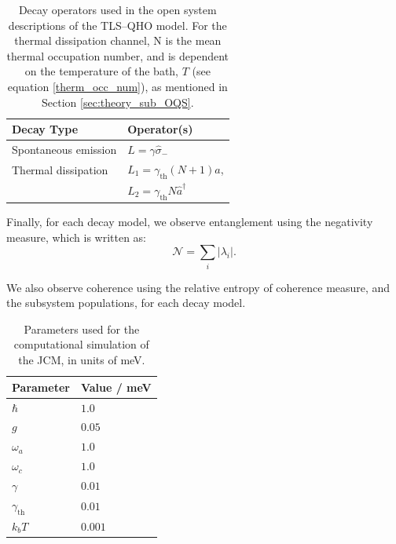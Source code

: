 \documentclass[11pt]{article}
\begin{document}
\begin{table}[H]
    \centering
    \caption{Decay operators used in the open system descriptions of the TLS--QHO model. For the thermal dissipation channel, N is the mean thermal occupation number, and is dependent on the temperature of the bath, $T$ (see equation \ref{therm_occ_num}), as mentioned in Section \ref{sec:theory_sub_OQS}.}
    \begin{tabular}{l|l}
        \toprule
        \textbf{Decay Type} & \textbf{Operator(s)} \\
        \midrule
        Spontaneous emission & $L = \gamma\hat{\sigma}_-$ \\
        Thermal dissipation & $L_1 = \gamma_{\scriptscriptstyle \text{th}}(N+1)\hat{a}$, \\
                            & $L_2 = \gamma_{\scriptscriptstyle \text{th}}N\hat{a}^\dagger$ \\
        \bottomrule
    \end{tabular}
    \label{tab:decay_ops}
\end{table}

\noindent Finally, for each decay model, we observe entanglement using the negativity measure, which is written as:
\begin{equation*} 
    \mathcal{N} = \sum_i |\lambda_i|.
\end{equation*}

We also observe coherence using the relative entropy of coherence measure, and the subsystem populations, for each decay model.\\

\begin{table}[h]
    \centering
    \caption{Parameters used for the computational simulation of the JCM, in units of meV.}
    \begin{tabular}{l|l}
        \toprule
        \textbf{Parameter} & \textbf{Value / meV} \\
        \midrule
        $\hbar$ & $1.0$ \\
        $g$ & $0.05$ \\
        $\omega_a$ & $1.0$ \\
        $\omega_c$ & $1.0$ \\
        $\gamma$ & $0.01$ \\
        $\gamma_{\scriptscriptstyle \text{th}}$ & $0.01$ \\
        $k_bT$ & $0.001$ \\
        \bottomrule
    \end{tabular}
    \label{tab:JCM_parameters}
\end{table}
\end{document}
